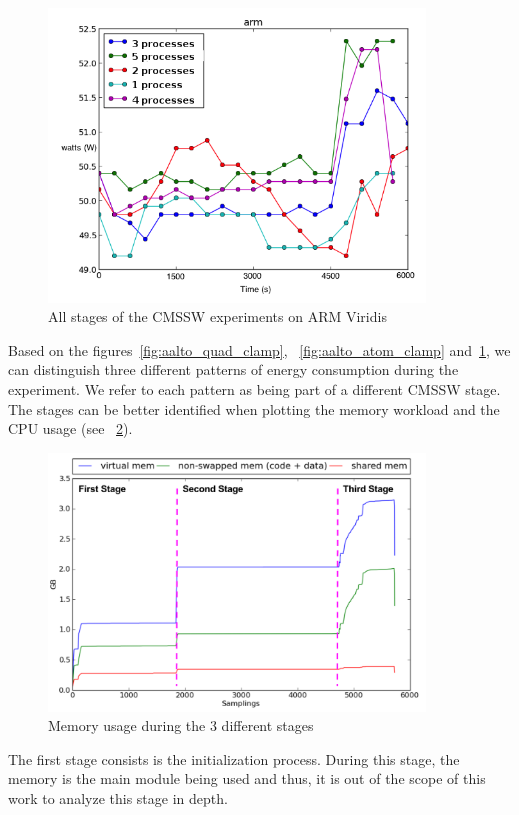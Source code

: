 \begin{figure}[h]
  \centering
    \includegraphics[width=100mm]{"img/aalto/aalto_total_arm"}
    \caption{All stages of the CMSSW experiments on ARM Viridis}
    \label{fig:aalto_arm_clamp}
\end{figure}

Based on the figures~\ref{fig:aalto_quad_clamp}, ~\ref{fig:aalto_atom_clamp} 
and~\ref{fig:aalto_arm_clamp}, we can distinguish three different patterns of energy consumption during the experiment. 
We refer to each pattern as being part of a different CMSSW stage. The stages can be better identified 
when plotting the memory workload and the CPU usage (see ~\ref{fig:memory_stages}).

\begin{figure}[h]
  \centering
    \includegraphics[width=100mm]{"img/aalto/memory_stages"}
    \caption{Memory usage during the 3 different stages}
    \label{fig:memory_stages}
\end{figure}

The first stage consists is the initialization process. During this stage, the memory is the main module being used and thus, it is out of the scope of this work to analyze this stage in depth. 


